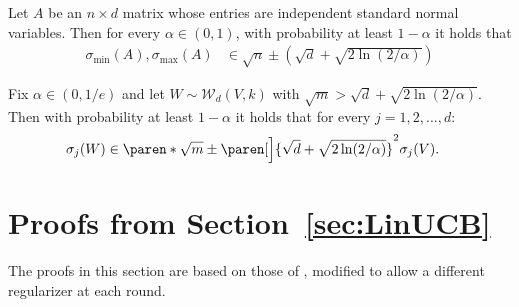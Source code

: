 \documentclass{article}
\DeclarePairedDelimiter{\paren}()
\newcommand{\Wishart}{\mathcal{W}}
\begin{document}
\begin{claim}%
  \label{claim:gaussian-matrix-tails}
  Let $A$ be an $n\times d$ matrix whose entries are independent
  standard normal variables.  Then for every $\alpha\in(0,1)$, with
  probability at least $1-\alpha$ it holds that
  \begin{align*}
    \sigma_{\min}(A), \sigma_{\max}(A) &\in \sqrt{n} \pm (\sqrt{d} + \sqrt{2\ln(2/\alpha)})
  \end{align*}
\end{claim}

\begin{claim}%
  \label{claim:wishart-tails}
  Fix $\alpha\in(0,1/e)$ and let $W\sim\Wishart_d(V, k)$ with $\sqrt{m}
  > \sqrt{d} + \sqrt{2\ln(2/\alpha)}$.  Then with probability at least
  $1-\alpha$ it holds that for every $j = 1,2,\dotsc,d$:
  \begin{align*}
    \sigma_j(W) &\in \paren*{\sqrt{m} \pm \paren[\Big]{\sqrt{d} + \sqrt{2\ln(2/\alpha)}}}^2 \sigma_j(V).
  \end{align*}
\end{claim}


\section{Proofs from Section~\ref{sec:LinUCB}}

The proofs in this section are based on those of
\citet{AbbasiYadkoriImprovedAlgorithmsLinear2011}, modified to allow a
different regularizer at each round.

\CalcBeta*
\end{document}
